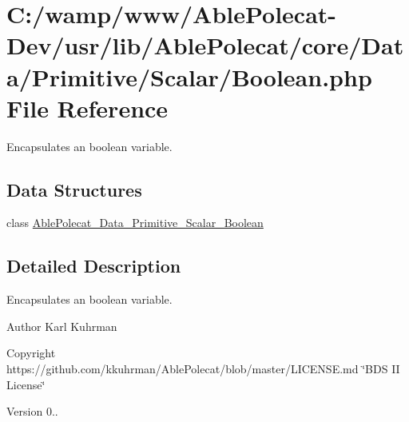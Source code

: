 \hypertarget{_boolean_8php}{}\section{C\+:/wamp/www/\+Able\+Polecat-\/\+Dev/usr/lib/\+Able\+Polecat/core/\+Data/\+Primitive/\+Scalar/\+Boolean.php File Reference}
\label{_boolean_8php}


Encapsulates an boolean variable.  


\subsection*{Data Structures}
\begin{DoxyCompactItemize}
\item 
class \hyperlink{class_able_polecat___data___primitive___scalar___boolean}{Able\+Polecat\+\_\+\+Data\+\_\+\+Primitive\+\_\+\+Scalar\+\_\+\+Boolean}
\end{DoxyCompactItemize}


\subsection{Detailed Description}
Encapsulates an boolean variable. 

\begin{DoxyAuthor}{Author}
Karl Kuhrman 
\end{DoxyAuthor}
\begin{DoxyCopyright}{Copyright}
https\+://github.com/kkuhrman/\+Able\+Polecat/blob/master/\+L\+I\+C\+E\+N\+S\+E.\+md \char`\"{}\+B\+D\+S I\+I License\char`\"{} 
\end{DoxyCopyright}
\begin{DoxyVersion}{Version}
0.. 
\end{DoxyVersion}
